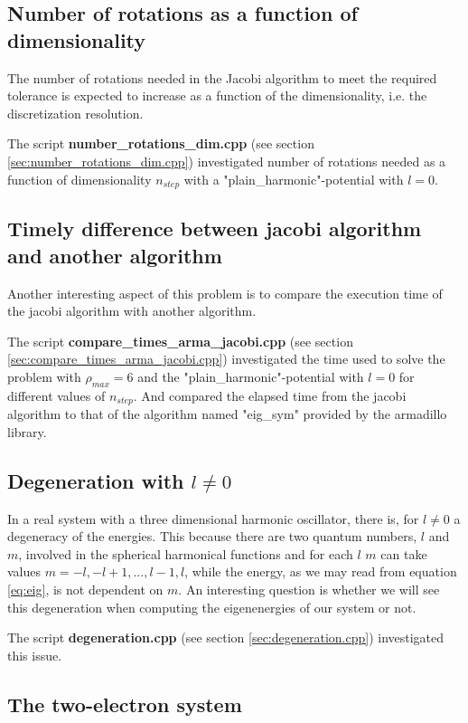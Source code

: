 \documentclass[a4paper,10pt,english]{article}
\numberwithin{figure}{subsection}
\numberwithin{table}{subsection}
\numberwithin{equation}{subsection}
\begin{document}
\subsection{Number of rotations as a function of dimensionality}

The number of rotations needed in the Jacobi algorithm to meet the required tolerance is 
expected to increase as a function of the dimensionality, i.e. the discretization resolution. 

The script \textbf{number\_rotations\_dim.cpp} (see section \ref{sec:number_rotations_dim.cpp})
investigated number of rotations needed as a function of dimensionality $n_{step}$
with a "plain\_harmonic"-potential with $l=0$.


\subsection{Timely difference between jacobi algorithm and another algorithm}

Another interesting aspect of this problem is to compare the execution time of
the jacobi algorithm with another algorithm. 

The script \textbf{compare\_times\_arma\_jacobi.cpp} 
(see section \ref{sec:compare_times_arma_jacobi.cpp}) 
investigated the time used to solve the problem with $\rho_{max} = 6$ and
the 
"plain\_harmonic"-potential with $l=0$
for different values of $n_{step}$. 
And compared the elapsed time from the jacobi algorithm to that of the 
algorithm named "eig\_sym" provided by the armadillo library. 

\subsection{Degeneration with $l \neq 0$}

In a real system with a three dimensional harmonic oscillator,
there is, for $l\neq 0$ a degeneracy of the energies. 
This because there are two quantum numbers, $l$ and $m$, 
involved in the spherical harmonical functions and for each $l$ 
$m$ can take values $m= -l, -l+1 , ... , l-1, l$,
while the energy, as we may read from equation \ref{eq:eig}, 
is not dependent on $m$. 
An interesting question is whether we will see this degeneration when 
computing the eigenenergies of our system or not. 

The script \textbf{degeneration.cpp} (see section \ref{sec:degeneration.cpp}) 
investigated this issue.


\subsection{The two-electron system}
\end{document}
